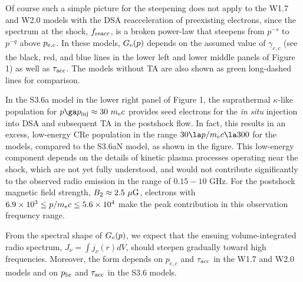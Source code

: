 \documentclass[twocolumn]{aastex61}
\def\muG{~{\mu\rm G}}
\begin{document}
Of course such a simple picture for the steepening does not apply to the W1.7 and W2.0 models with the DSA reacceleration
of preexisting electrons,
since the spectrum at the shock, $f_{\rm reacc}$, is a broken power-law that steepens from $p^{-s}$ to $p^{-q}$
above $p_{\rm e,c}$. In these models, $G_{\rm e}(p)$ 
depends on the assumed value of $\gamma_{e,c}$ (see the black, red, and blue lines in the lower left and lower middle panels of Figure 1) 
as well as $\tau_{\rm acc}$.
The models without TA are also shown as green long-dashed lines for comparison.

In the S3.6a model in the lower right panel of Figure 1, the suprathermal $\kappa$-like population for $p\ga p_{\rm inj}\approx 30\ m_{\rm e} c$ provides seed electrons 
for the {\it in situ} injection into DSA and subsequent TA in the postshock flow. 
In fact, this results in an excess, low-energy CRe population in the range
$30\la p/m_{\rm e}c \la300$ for the models, 
compared to the S3.6aN model, as shown in the figure.
This low-energy component depends on the details of kinetic plasma processes operating near the shock, which are not yet fully understood,
and would not contribute significantly to the observed radio emission in the range of $0.15-10$ GHz. 
For the postshock magnetic field strength, $B_2\approx 2.5 \muG$, electrons with $6.9 \times 10^3 \le p/m_{\rm e}c \le 5.6\times 10^4$
make the peak contribution in this observation frequency range.

From the spectral shape of $G_{\rm e}(p)$, we expect that the ensuing volume-integrated radio spectrum, $J_{\nu}=\int j_{\nu}(r)dV$, 
should steepen gradually toward high frequencies. Moreover, the form
depends on $p_{e,c}$ and $\tau_{\rm acc}$ in the W1.7 and W2.0 models and on $p_{\rm br}$
and $\tau_{\rm acc}$ in the S3.6 models.
\end{document}
